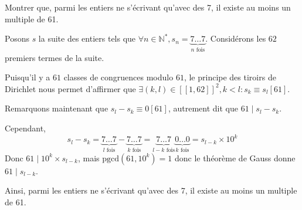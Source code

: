 \documentclass{article}
\begin{document}
\begin{question_kholle}{Montrer que, parmi les entiers ne s'écrivant qu'avec des 7, il existe au moins un multiple de 61.}

	Posons $s$ la suite des entiers tels que $\forall n \in \mathbb{N}^{*}, s_{n} = \underbrace{ 7\dots 7 }_{ n \text{ fois} }$.
	Considérons les $62$ premiers termes de la suite.

	Puisqu'il y a $61$ classes de congruences modulo $61$, le principe des tiroirs de Dirichlet nous permet d'affirmer que $\exists (k, l) \in [ \! [ 1, 62 ] \!]^{2}, k < l:s_{k} \equiv s_{l}[61]$.

	Remarquons maintenant que $s_{l}-s_{k} \equiv 0 [61]$, autrement dit que $61\mid s_{l} - s_{k}$.

	Cependant, $$
		s_{l} - s_{k} = \underbrace{ 7\dots7 }_{ l \text{ fois} } - \underbrace{ 7 \dots 7 }_{ k \text{ fois} } = \underbrace{ 7 \dots 7 }_{ l-k \text{ fois} } \underbrace{ 0 \dots 0 }_{ k \text{ fois} } = s_{l-k} \times 10^{k}
	$$
	Donc $61 \mid 10^{k} \times s_{l-k}$, mais $\mathrm{pgcd}(61, 10^{k}) = 1$ donc le théorème de Gauss donne $61\mid s_{l-k}$.

	Ainsi, parmi les entiers ne s'écrivant qu'avec des 7, il existe au moins un multiple de 61.
\end{question_kholle}
\end{document}
